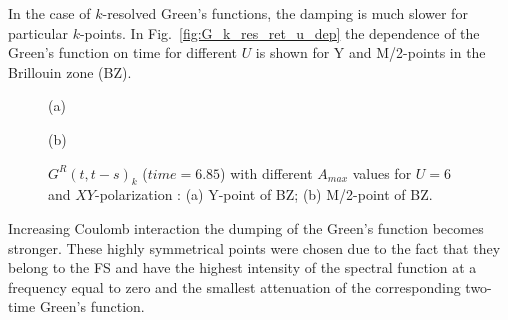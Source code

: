 In the case of $k$-resolved Green's functions, the damping is much slower for particular $k$-points. In Fig.~\ref{fig:G_k_res_ret_u_dep} the dependence of the Green's function on time for different $U$ is shown for Y and M/2-points in the Brillouin zone (BZ). 
\begin{figure}[h!]
\begin{minipage}[h]{0.5\linewidth}
 (a) \\
\end{minipage}
\hfill
\begin{minipage}[h]{0.5\linewidth}
 (b) \\
\end{minipage}
\caption{$G^{R}(t,t-s)_k$ ($time=6.85$) with different $A_{max}$ values for $U=6$ and $XY$-polarization : (a) Y-point of BZ; (b) M/2-point of BZ.}
\label{fig:G_k_res_ret_A_dep_xy}
\end{figure}
Increasing Coulomb interaction the dumping of the Green's function becomes stronger. These highly symmetrical points were chosen due to the fact that they belong to the FS and have the highest intensity of the spectral function at a frequency equal to zero and the smallest attenuation of the corresponding two-time Green's function. 

